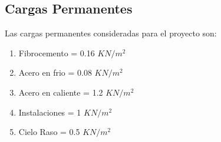 \documentclass{article}
\begin{document}

\subsection{Cargas Permanentes}
Las cargas permanentes consideradas para el proyecto son:
\begin{enumerate}
    \item Fibrocemento = 0.16 $KN/m^2$
    \item Acero en frio = 0.08 $KN/m^2$
    \item Acero en caliente = 1.2 $KN/m^2$
    \item Instalaciones = 1 $KN/m^2$
    \item Cielo Raso = 0.5 $KN/m^2$
    
\end{enumerate}
\end{document}
